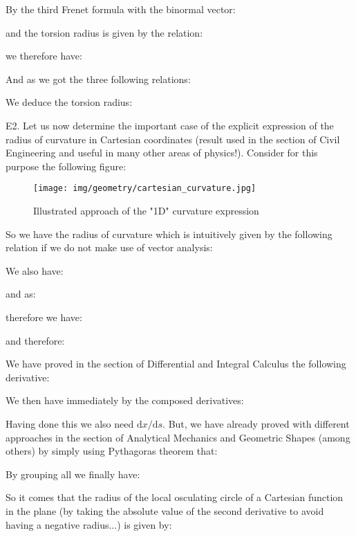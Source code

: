 {\begin{tcolorbox}[colframe=black,colback=white,sharp corners]
	By the third Frenet formula with the binormal vector:
	
	and the torsion radius is given by the relation:
	
	we therefore have:
	\end{tcolorbox}
	
	\pagebreak
	\begin{tcolorbox}[colframe=black,colback=white,sharp corners]
	
	And as we got the three following relations:
	
	We deduce the torsion radius:
	
	
	E2. Let us now determine the important case of the explicit expression of the radius of curvature in Cartesian coordinates (result used in the section of Civil Engineering and useful in many other areas of physics!). Consider for this purpose the following figure:
	\begin{figure}[H]
		\centering
		\texttt{[image: img/geometry/cartesian\_curvature.jpg]}
		\caption[]{Illustrated approach of the "1D" curvature expression}
	\end{figure}
	So we have the radius of curvature which is intuitively given by the following relation if we do not make use of vector analysis:
	
	We also have:
	
	and as:
	
	\end{tcolorbox}
	
	\pagebreak
	\begin{tcolorbox}[colframe=black,colback=white,sharp corners]
	therefore we have:
	
	and therefore:
	
	We have proved in the section of Differential and Integral Calculus the following derivative:	
	
	We then have immediately by the composed derivatives:
	
	Having done this we also need $\mathrm{d}x/\mathrm{d}s$. But, we have already proved with different approaches in the section of Analytical Mechanics and Geometric Shapes (among others) by simply using Pythagoras theorem that:
	
	By grouping all we finally have:
	
	So it comes that the radius of the local osculating circle of a Cartesian function in the plane (by taking the absolute value of the second derivative to avoid having a negative radius...) is given by\label{radius of curvature}:
	

\end{tcolorbox}}
